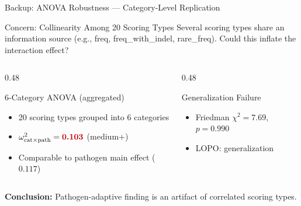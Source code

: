 \begin{frame}[noframenumbering]{Backup: ANOVA Robustness --- Category-Level Replication}
  \footnotesize
  \begin{block}{Concern: Collinearity Among 20 Scoring Types}
    Several scoring types share an information source (e.g., freq, freq\_with\_indel, rare\_freq). Could this inflate the interaction effect?
  \end{block}
  \begin{columns}[T]
    \begin{column}{0.48\textwidth}
      \begin{block}{6-Category ANOVA (aggregated)}
        \begin{itemize}
          \item 20 scoring types grouped into 6 categories
          \item $\omega^2_{\text{cat} \times \text{path}} = \highlight{0.103}$ (medium+)
          \item Comparable to pathogen main effect ($0.117$)
        \end{itemize}
      \end{block}
    \end{column}
    \begin{column}{0.48\textwidth}
      \begin{block}{Generalization Failure}
        \begin{itemize}
          \item Friedman $\chi^2 = 7.69$, $p = 0.990$
          \item LOPO:  generalization
        \end{itemize}
      \end{block}
    \end{column}
  \end{columns}
  \centering
  {\small \textbf{Conclusion:} Pathogen-adaptive finding is  an artifact of correlated scoring types.}
\end{frame}

